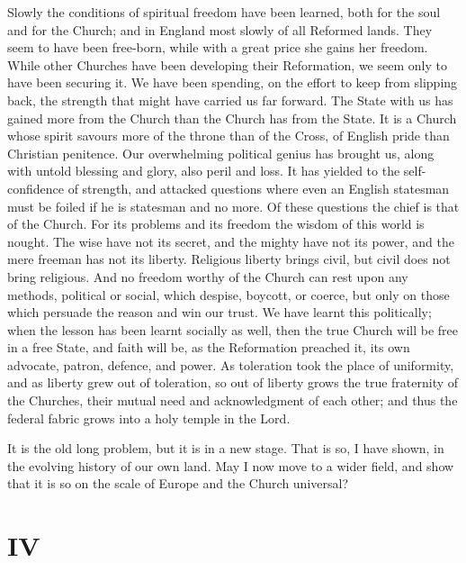 \documentclass[12pt,a5paper,twoside]{book}
\begin{document}
Slowly the conditions of spiritual freedom have been 
learned, both for the soul and for the Church; and 
in England most slowly of all Reformed lands. They 
seem to have been free-born, while with a great price 
she gains her freedom. While other Churches have 
been developing their Reformation, we seem only to 
have been securing it. We have been spending, on 
the effort to keep from slipping back, the strength that 
might have carried us far forward. The State with 
us has gained more from the Church than the Church 
has from the State. It is a Church whose spirit 
savours more of the throne than of the Cross, of 
English pride than Christian penitence. Our overwhelming 
political genius has brought us, along with 
untold blessing and glory, also peril and loss. It has 
yielded to the self-confidence of strength, and attacked 
questions where even an English statesman must be 
foiled if he is statesman and no more. Of these 
questions the chief is that of the Church. For its 
problems and its freedom the wisdom of this world 
is nought. The wise have not its secret, and the 
mighty have not its power, and the mere freeman has 
not its liberty. Religious liberty brings civil, but 
civil does not bring religious. And no freedom worthy 
of the Church can rest upon any methods, political 
or social, which despise, boycott, or coerce, but only 
on those which persuade the reason and win our trust. 
We have learnt this politically; when the lesson has 
been learnt socially as well, then the true Church will 
be free in a free State, and faith will be, as the 
Reformation preached it, its own advocate, patron, 
defence, and power. As toleration took the place of 
uniformity, and as liberty grew out of toleration, 
so out of liberty grows the true fraternity of the 
Churches, their mutual need and acknowledgment of 
each other; and thus the federal fabric grows into a 
holy temple in the Lord. 

It is the old long problem, but it is in a new stage. 
That is so, I have shown, in the evolving history of 
our own land. May I now move to a wider field, 
and show that it is so on the scale of Europe and the 
Church universal? 

\section*{IV}
\end{document}
